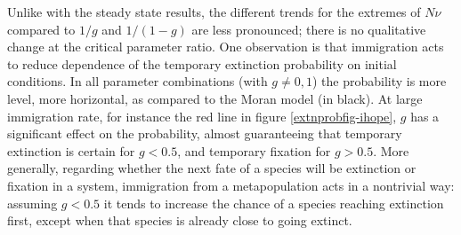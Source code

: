 Unlike with the steady state results, the different trends for the extremes of $N\nu$ compared to $1/g$ and $1/(1-g)$ are less pronounced; there is no qualitative change at the critical parameter ratio. 
One observation is that immigration acts to reduce dependence of the temporary extinction probability on initial conditions. 
In all parameter combinations (with $g\neq 0,1$) the probability is more level, more horizontal, as compared to the Moran model (in black). %
At large immigration rate, for instance the red line in figure \ref{extnprobfig-ihope}, $g$ has a significant effect on the probability, almost guaranteeing that temporary extinction is certain for $g<0.5$, and temporary fixation for $g>0.5$. 
More generally, regarding whether the next fate of a species will be extinction or fixation in a system, immigration from a metapopulation acts in a nontrivial way: assuming $g<0.5$ it tends to increase the chance of a species reaching extinction first, except when that species is already close to going extinct. 


